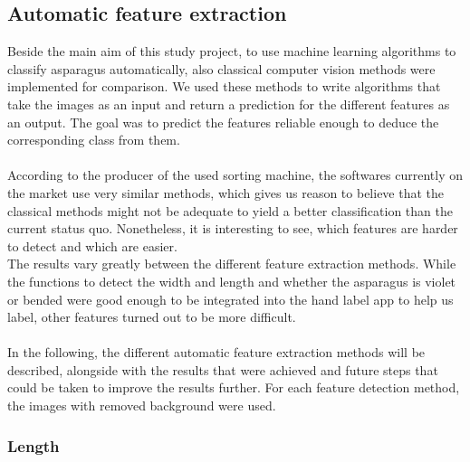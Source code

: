 \subsection{Automatic feature extraction}

Beside the main aim of this study project, to use machine learning algorithms to classify asparagus automatically, also classical computer vision methods were implemented for comparison. We used these methods to write algorithms that take the images as an input and return a prediction for the different features as an output. The goal was to predict the features reliable enough to deduce the corresponding class from them. \\
\\
According to the producer of the used sorting machine, the softwares currently on the market use very similar methods, which gives us reason to believe that the classical methods might not be adequate to yield a better classification than the current status quo. Nonetheless, it is interesting to see, which features are harder to detect and which are easier. \\
The results vary greatly between the different feature extraction methods. While the functions to detect the width and length and whether the asparagus is violet or bended were good enough to be integrated into the hand label app to help us label, other features turned out to be more difficult. \\
\\
In the following, the different automatic feature extraction methods will be described, alongside with the results that were achieved and future steps that could be taken to improve the results further. For each feature detection method, the images with removed background were used.


\subsubsection{Length}

